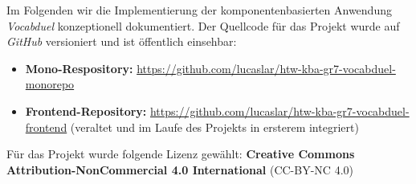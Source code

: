 Im Folgenden wir die Implementierung der komponentenbasierten Anwendung \textit{Vocabduel} konzeptionell dokumentiert.
Der Quellcode f\"ur das Projekt wurde auf \textit{GitHub} versioniert und ist \"offentlich einsehbar:

\begin{itemize}
    \item \textbf{Mono-Respository:} \url{https://github.com/lucaslar/htw-kba-gr7-vocabduel-monorepo}
    \item \textbf{Frontend-Repository:} \url{https://github.com/lucaslar/htw-kba-gr7-vocabduel-frontend} (veraltet und im Laufe des Projekts in ersterem integriert)
\end{itemize}

F\"ur das Projekt wurde folgende Lizenz gew\"ahlt: \textbf{Creative Commons Attribution-NonCommercial 4.0 International} (CC-BY-NC 4.0)
